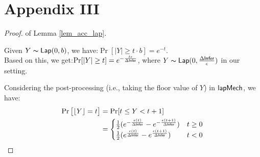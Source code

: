 \documentclass{article}
\begin{document}
\section*{Appendix III}
\begin{proof} of Lemma \ref{lem_acc_lap}.

Given $Y \thicksim \mathsf{Lap}(0, b)$, we have\cite{dwork2014algorithmic}:$\Pr[|Y| \geq t \cdot b] = e^{- t}.$\\
Based on this, we get:$\Pr[|Y| \geq t] = e^{- \frac{t \epsilon}{\Delta \mathsf{Infer}}}$, where $Y \thicksim \mathsf{Lap}(0, \frac{\Delta \mathsf{Infer}}{\epsilon})$ in our setting.

Considering the post-processing (i.e., taking the floor value of $Y$) in $\mathsf{lapMech}$, we have:
\begin{align*}
\Pr\big[\lfloor Y \rfloor = t\big]&= \Pr[ t \leq Y < t + 1]\\
&= 
\begin{cases}
\frac{1}{2} (e^{- \frac{\epsilon (t)}{\Delta \mathsf{Infer}}} - e^{- \frac{\epsilon (t + 1)}{\Delta \mathsf{Infer}}}) &  t \geq 0\\
\frac{1}{2} (e^{\frac{\epsilon (t)}{\Delta \mathsf{Infer}}} - e^{\frac{\epsilon (t + 1)}{\Delta \mathsf{Infer}}}) & t < 0
\end{cases}
\end{align*}


\end{proof}
\end{document}
